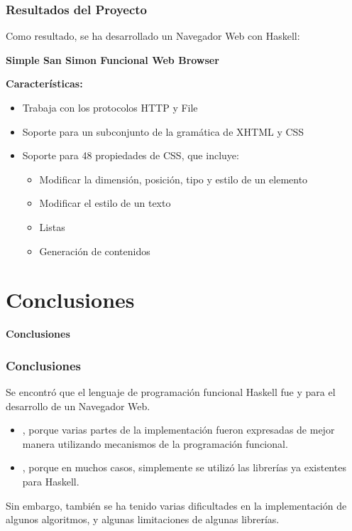 \documentclass[12pt]{beamer}
\begin{document}
\begin{frame}
\frametitle{Resultados del Proyecto}
Como resultado, se ha desarrollado un Navegador Web con Haskell:

\begin{center}
	\textbf{Simple San Simon Funcional Web Browser}
\end{center}

\textbf{Características:}\\
\begin{itemize}
	\item Trabaja con los protocolos HTTP y File
	\item Soporte para un subconjunto de la gramática de XHTML y CSS
	\item Soporte para 48 propiedades de CSS, que incluye:
	\begin{itemize}
		\item Modificar la dimensión, posición, tipo y estilo de un elemento
		\item Modificar el estilo de un texto
		\item Listas
		\item Generación de contenidos
	\end{itemize}
\end{itemize}
\end{frame}

\section{Conclusiones}

\begin{frame}
\begin{center}
	\textbf{\Large Conclusiones}
\end{center}
\end{frame}

\begin{frame}
\frametitle{Conclusiones}

\begin{block}{}
Se encontró que el lenguaje de programación funcional Haskell fue 
 y  para el desarrollo de un Navegador Web.
\begin{itemize}
	\item {}, porque varias partes de la implementación fueron 
	expresadas de mejor manera utilizando mecanismos de la programación funcional.
	\item {}, porque en muchos casos, simplemente se utilizó las librerías
	ya existentes para Haskell.
\end{itemize}
\end{block}

\begin{alertblock}{}
Sin embargo, también se ha tenido varias dificultades en la implementación de algunos
algoritmos, y algunas limitaciones de algunas librerías.
\end{alertblock}
\end{frame}
\end{document}
